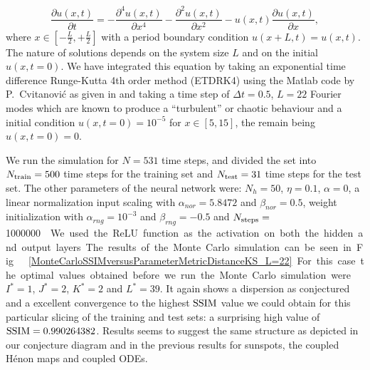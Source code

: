 \documentclass[journal]{IEEEtran}
\begin{document}
\begin{equation}
\label{kuramotoSivashinskyequation}
\frac{\partial u(x,t)}{\partial t} = -\frac{\partial^4 u(x,t)}{\partial x^4}-\frac{\partial^2 u(x,t)}{\partial x^2}-u(x,t)
\frac{\partial u(x,t)}{\partial x},
\end{equation}
where $x \in [-\frac{L}{2},+\frac{L}{2}]$ with a period boundary condition 
$u(x+L,t)=u(x,t)$. The nature of solutions depends on the system size $L$ and on the initial $u(x,t=0)$. 
We have integrated this equation by taking an exponential time difference Runge-Kutta 4th order method (ETDRK4)
using the Matlab code by P.\ Cvitanovi\'c as given in \cite{BibEntry2007Apr} and 
taking a time step of $\Delta t=0.5$, $L=22$ Fourier modes which are known to produce a ``turbulent'' or chaotic behaviour
and a initial condition $u(x,t=0)=10^{-5}$ for $x\in[5,15]$, the remain being $u(x,t=0)=0$.



We run the simulation for $N=531$ time steps, and divided the set into $N_{\textnormal{train}}=500$ time steps for the training set
and $N_{\textnormal{test}}=31$ time steps for the test set. The other parameters of the neural network were:
$N_h=50$, $\eta=0.1$, $\alpha=0$, a linear normalization input scaling with 
$\alpha_{nor} = 5.8472$ and $\beta_{nor} =0.5$, weight initialization 
with $\alpha_{rng} = 10^{-3}$ and $\beta_{rng} = -0.5$ and $N_{\textnormal{steps}}=$\SI{1000000}\nobreak. 
We used the ReLU function as the activation on both the hidden and output layers.

The results of the Monte Carlo simulation can be seen in Fig.\ \ref{MonteCarloSSIMversusParameterMetricDistanceKS_L=22}. For this 
case the optimal values obtained before we run the Monte Carlo simulation were $I^*=1$, $J^*=2$, $K^*=2$ and $L^*=39$. It again shows a dispersion as 
conjectured and a excellent convergence to the highest $\textnormal{SSIM}$ value we could obtain for this particular slicing of the training and 
test sets: a surprising high value of $\textnormal{SSIM}=0.990264382$. Results seems to suggest the same structure as depicted in our 
conjecture diagram and in the previous results for sunspots, the coupled H\'{e}non maps and coupled ODEs. 


\end{document}
